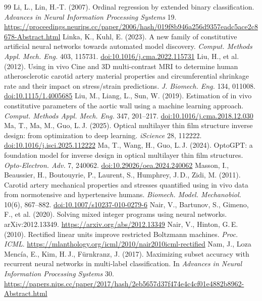 \begin{thebibliography}{99}
 Li, L., Lin, H.-T. (2007). Ordinal regression by extended binary classification. \emph{Advances in Neural Information Processing Systems} 19. \url{https://proceedings.neurips.cc/paper/2006/hash/019f8b946a256d9357eadc5ace2c8678-Abstract.html}
 Linka, K., Kuhl, E. (2023). A new family of constitutive artificial neural networks towards automated model discovery. \emph{Comput. Methods Appl. Mech. Eng.} 403, 115731. \href{https://doi.org/10.1016/j.cma.2022.115731}{doi:10.1016/j.cma.2022.115731}
 Liu, H., et al. (2012). Using in vivo Cine and 3D multi-contrast MRI to determine human atherosclerotic carotid artery material properties and circumferential shrinkage rate and their impact on stress/strain predictions. \emph{J. Biomech. Eng.} 134, 011008. \href{https://doi.org/10.1115/1.4005685}{doi:10.1115/1.4005685}
 Liu, M., Liang, L., Sun, W. (2019). Estimation of in vivo constitutive parameters of the aortic wall using a machine learning approach. \emph{Comput. Methods Appl. Mech. Eng.} 347, 201--217. \href{https://doi.org/10.1016/j.cma.2018.12.030}{doi:10.1016/j.cma.2018.12.030}
 Ma, T., Ma, M., Guo, L.\,J. (2025). Optical multilayer thin film structure inverse design: from optimization to deep learning. \emph{iScience} 28, 112222. \href{https://doi.org/10.1016/j.isci.2025.112222}{doi:10.1016/j.isci.2025.112222}
 Ma, T., Wang, H., Guo, L.\,J. (2024). OptoGPT: a foundation model for inverse design in optical multilayer thin film structures. \emph{Opto-Electron. Adv.} 7, 240062. \href{https://doi.org/10.29026/oea.2024.240062}{doi:10.29026/oea.2024.240062}
 Masson, I., Beaussier, H., Boutouyrie, P., Laurent, S., Humphrey, J.\,D., Zidi, M. (2011). Carotid artery mechanical properties and stresses quantified using in vivo data from normotensive and hypertensive humans. \emph{Biomech. Model. Mechanobiol.} 10(6), 867--882. \href{https://doi.org/10.1007/s10237-010-0279-6}{doi:10.1007/s10237-010-0279-6}
 Nair, V., Bartunov, S., Gimeno, F., et al. (2020). Solving mixed integer programs using neural networks. arXiv:2012.13349. \url{https://arxiv.org/abs/2012.13349}
 Nair, V., Hinton, G.\,E. (2010). Rectified linear units improve restricted Boltzmann machines. \emph{Proc. ICML}. \url{https://mlanthology.org/icml/2010/nair2010icml-rectified}
 Nam, J., Loza Mencía, E., Kim, H.\,J., Fürnkranz, J. (2017). Maximizing subset accuracy with recurrent neural networks in multi-label classification. In \emph{Advances in Neural Information Processing Systems} 30. \url{https://papers.nips.cc/paper/2017/hash/2eb5657d37f474e4c4cf01e4882b8962-Abstract.html}

\end{thebibliography}

